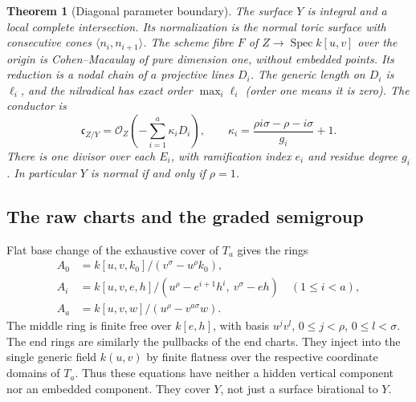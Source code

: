 \documentclass[11pt,reqno]{amsart}
\numberwithin{equation}{section}
\newtheorem{theorem}{Theorem}[section]
\theoremstyle{definition}\newtheorem{definition}[theorem]{Definition}
\theoremstyle{remark}\newtheorem{remark}[theorem]{Remark}
\newcommand{\OO}{\mathcal O}\newcommand{\II}{\mathcal I}
\DeclareMathOperator{\Spec}{Spec}\DeclareMathOperator{\PGL}{PGL}
\begin{document}
\begin{theorem}[Diagonal parameter boundary]
\label{thm:diagonal-v171}
The surface $Y$ is integral and a local complete intersection. Its
normalization is the normal toric surface with consecutive cones
$\langle n_i,n_{i+1}\rangle$. The scheme fibre $F$ of
$Z\to\Spec k[u,v]$ over the origin is Cohen--Macaulay of pure
dimension one, without embedded points. Its reduction is a nodal
chain of $a$ projective lines $D_i$. The generic length on $D_i$ is
$\ell_i$, and the nilradical has exact order $\max_i\ell_i$ (order
one means it is zero). The conductor is
\begin{equation}\label{eq:diagonal-conductor-v171}
 \mathfrak c_{Z/Y}=\OO_Z\left(-\sum_{i=1}^a\kappa_iD_i\right),
 \qquad
 \kappa_i=\frac{\rho i\sigma-\rho-i\sigma}{g_i}+1.
\end{equation}
There is one divisor over each $E_i$, with ramification index $e_i$
and residue degree $g_i$. In particular $Y$ is normal if and only if
$\rho=1$.
\end{theorem}

\subsection{The raw charts and the graded semigroup}
Flat base change of the exhaustive cover of $T_a$ gives the rings
\begin{align}
 A_0&=k[u,v,k_0]/(v^\sigma-u^\rho k_0),\label{eq:raw-first-v171}\\
 A_i&=k[u,v,e,h]/(u^\rho-e^{i+1}h^i,\ v^\sigma-eh)
       \quad(1\leq i<a),\label{eq:raw-middle-v171}\\
 A_a&=k[u,v,w]/(u^\rho-v^{a\sigma}w).
 \label{eq:raw-last-v171}
\end{align}
The middle ring is finite free over $k[e,h]$, with basis
$u^jv^l$, $0\leq j<\rho$, $0\leq l<\sigma$. The end rings are
similarly the pullbacks of the end charts. They inject into the
single generic field $k(u,v)$ by finite flatness over the respective
coordinate domains of $T_a$. Thus these equations have neither a
hidden vertical component nor an embedded component. They cover $Y$,
not just a surface birational to $Y$.
\end{document}

